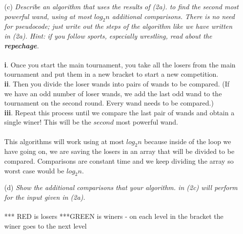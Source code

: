 \documentclass[11pt]{article} \setlength{\oddsidemargin}{0in}
\begin{document}
{\begin{enumerate}
 
  \item[(c)]{\textit{Describe an algorithm that uses the results of (2a).  %
        to find the second most powerful wand, using at most $log_2 n$
        additional comparisons. There is no need for pseudocode; just
        write out the steps of the algorithm like we have written in
        (2a). Hint: if you follow sports, especially wrestling, read
        about the \textbf{repechage}.}}
    \\\\
    \textbf{i}. Once you start the main tournament, you take all the losers from the main tournament and put them in a new bracket to start a new competition.\\
    \textbf{ii}. Then you divide the loser wands into pairs of wands to be compared. (If we have an odd number of loser wands, we add the last odd wand to the tournament on the second round. Every wand needs to be compared.)\\
    \textbf{iii}. Repeat this process until we compare the last pair of wands and obtain a single winer! This will be the $second$ most powerful wand.\\\\
    This algorithms will work using at most $log_2n$ because inside of the loop we have going on, we are saving the losers in an array that will be divided to be compared. Comparisons are constant time and we keep dividing the array so worst case would be $log_2n$.
    
  \newpage
  
  \item[(d)]{\textit{Show the additional comparisons that your algorithm.   %
        in (2c) will perform for the input given in (2a).}}
    \\\\
    *** RED is losers ***GREEN is winers - on each level in the bracket the winer goes to the next level\\\\
    
    \\


\end{enumerate}}
\end{document}
